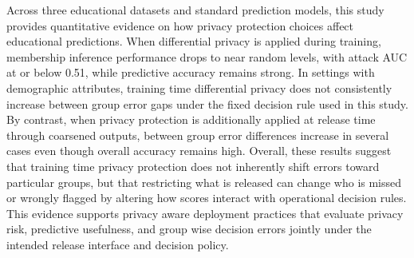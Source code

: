 \documentclass{edm_article}
\begin{document}
Across three educational datasets and standard prediction models, this study provides quantitative evidence on how privacy protection choices affect educational predictions. When differential privacy is applied during training, membership inference performance drops to near random levels, with attack AUC at or below 0.51, while predictive accuracy remains strong. In settings with demographic attributes, training time differential privacy does not consistently increase between group error gaps under the fixed decision rule used in this study. By contrast, when privacy protection is additionally applied at release time through coarsened outputs, between group error differences increase in several cases even though overall accuracy remains high. Overall, these results suggest that training time privacy protection does not inherently shift errors toward particular groups, but that restricting what is released can change who is missed or wrongly flagged by altering how scores interact with operational decision rules. This evidence supports privacy aware deployment practices that evaluate privacy risk, predictive usefulness, and group wise decision errors jointly under the intended release interface and decision policy.



%

\end{document}
